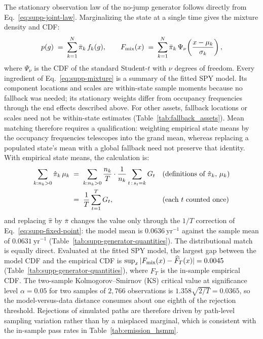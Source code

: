 The stationary observation law of the no-jump generator follows
directly from Eq.~\eqref{eq:supp-joint-law}. Marginalizing the state
at a single time gives the mixture density and CDF:
\begin{equation}
  p(g) \;=\; \sum_{k=1}^{N} \bar\pi_k\, f_k(g),
  \qquad
  F_{\rm mix}(x) \;=\; \sum_{k=1}^{N} \bar\pi_k\,
  \Psi_\nu\!\left(\frac{x - \mu_k}{\sigma_k}\right),
  \label{eq:supp-mixture}
\end{equation}
where $\Psi_\nu$ is the CDF of the standard Student-$t$ with $\nu$
degrees of freedom. Every ingredient of Eq.~\eqref{eq:supp-mixture} is
a summary of the fitted SPY model. Its component locations and
scales are within-state sample moments because no fallback was
needed; its stationary weights differ from occupancy frequencies
through the end effects described above. For other assets, fallback
locations or scales need not be within-state estimates
(Table~\ref{tab:fallback_assets}). Mean matching therefore requires
a qualification: weighting empirical state means by the occupancy
frequencies telescopes into the grand mean, whereas replacing a
populated state's mean with a global fallback need not preserve that
identity. With empirical state means, the calculation is:
\begin{align}
  \sum_{k:n_k>0} \hat\pi_k\, \mu_k
   &\;=\; \sum_{k:n_k>0} \frac{n_k}{T} \cdot \frac{1}{n_k}
     \sum_{t \,:\, s_t = k} G_t
     && \text{(definitions of $\hat\pi_k$, $\mu_k$)} \notag \\
   &\;=\; \frac{1}{T} \sum_{t=1}^{T} G_t,
     && \text{(each $t$ counted once)}
  \label{eq:supp-mean}
\end{align}
and replacing $\hat\pi$ by $\bar\pi$ changes the value only through
the $1/T$ correction of Eq.~\eqref{eq:supp-fixed-point}: the model
mean is $0.0636~\mathrm{yr}^{-1}$ against the sample mean of
$0.0631~\mathrm{yr}^{-1}$ (Table~\ref{tab:supp-generator-quantities}).
The distributional match is equally direct.
Evaluated at the fitted SPY model, the largest gap between the model
CDF and the empirical CDF is
$\sup_x |F_{\rm mix}(x) - \widehat F_T(x)| = 0.0045$
(Table~\ref{tab:supp-generator-quantities}), where
$\widehat F_T$ is the in-sample empirical CDF. The two-sample
Kolmogorov--Smirnov (KS) critical value at significance level
$\alpha = 0.05$ for two samples of $2{,}766$ observations is
$1.358 \sqrt{2/T} = 0.0365$, so the model-versus-data distance
consumes about one eighth of the rejection threshold. Rejections of
simulated paths are therefore driven by path-level sampling
variation rather than by a misplaced marginal, which is consistent
with the in-sample pass rates in
Table~\ref{tab:emission_hsmm}.

